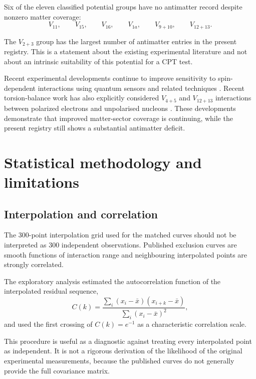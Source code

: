 \documentclass[aps,prd,reprint,superscriptaddress,nofootinbib]{revtex4-2}
\begin{document}
	Six of the eleven classified potential groups have no antimatter record
	despite nonzero matter coverage:
	\begin{equation}
		V_{11},\qquad
		V_{15},\qquad
		V_{16},\qquad
		V_{1a},\qquad
		V_{9+10},\qquad
		V_{12+13}.
	\end{equation}
	
	The $V_{2+3}$ group has the largest number of antimatter entries in the
	present registry. This is a statement about the existing experimental
	literature and not about an intrinsic suitability of this potential for
	a CPT test.
	
	Recent experimental developments continue to improve sensitivity to
	spin-dependent interactions using quantum sensors and related
	techniques \cite{Jiao2021,Liang2023,Jiang2024,Cong2025,WuYan2026}.
	Recent torsion-balance work has also explicitly considered
	$V_{4+5}$ and $V_{12+13}$ interactions between polarized electrons and
	unpolarised nucleons \cite{Jin2026}. These developments demonstrate
	that improved matter-sector coverage is continuing, while the present
	registry still shows a substantial antimatter deficit.
	
	\section{Statistical methodology and limitations}
	
	\subsection{Interpolation and correlation}
	
	The 300-point interpolation grid used for the matched curves should not
	be interpreted as 300 independent observations. Published exclusion
	curves are smooth functions of interaction range and neighbouring
	interpolated points are strongly correlated.
	
	The exploratory analysis estimated the autocorrelation function of the
	interpolated residual sequence,
	\begin{equation}
		C(k)
		=
		\frac{
			\sum_i(x_i-\bar x)(x_{i+k}-\bar x)
		}{
			\sum_i(x_i-\bar x)^2
		},
		\label{eq:ACF}
	\end{equation}
	and used the first crossing of $C(k)=e^{-1}$ as a characteristic
	correlation scale.
	
	This procedure is useful as a diagnostic against treating every
	interpolated point as independent. It is not a rigorous derivation of
	the likelihood of the original experimental measurements, because the
	published curves do not generally provide the full covariance matrix.
	
\end{document}

